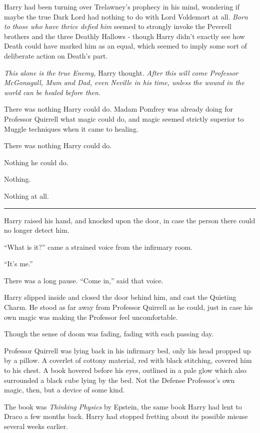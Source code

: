 Harry had been turning over Trelawney's prophecy in his mind, wondering
if maybe the true Dark Lord had nothing to do with Lord Voldemort at
all. \emph{Born to those who have thrice defied him} seemed to strongly
invoke the Peverell brothers and the three Deathly Hallows - though
Harry didn't exactly see how Death could have marked him as an equal,
which seemed to imply some sort of deliberate action on Death's part.

\emph{This alone is the true Enemy,} Harry thought. \emph{After this
will come Professor McGonagall, Mum and Dad, even Neville in his time,
unless the wound in the world can be healed before then.}

There was nothing Harry could do. Madam Pomfrey was already doing for
Professor Quirrell what magic could do, and magic seemed strictly
superior to Muggle techniques when it came to healing.

There was nothing Harry could do.

Nothing he could do.

Nothing.

Nothing at all.

\begin{center}\rule{3in}{0.4pt}\end{center}

Harry raised his hand, and knocked upon the door, in case the person
there could no longer detect him.

``What is it?'' came a strained voice from the infirmary room.

``It's me.''

There was a long pause. ``Come in,'' said that voice.

Harry slipped inside and closed the door behind him, and cast the
Quieting Charm. He stood as far away from Professor Quirrell as he
could, just in case his own magic was making the Professor feel
uncomfortable.

Though the sense of doom was fading, fading with each passing day.

Professor Quirrell was lying back in his infirmary bed, only his head
propped up by a pillow. A coverlet of cottony material, red with black
stitching, covered him to his chest. A book hovered before his eyes,
outlined in a pale glow which also surrounded a black cube lying by the
bed. Not the Defense Professor's own magic, then, but a device of some
kind.

The book was \emph{Thinking Physics} by Epstein, the same book Harry had
lent to Draco a few months back. Harry had stopped fretting about its
possible misuse several weeks earlier.

